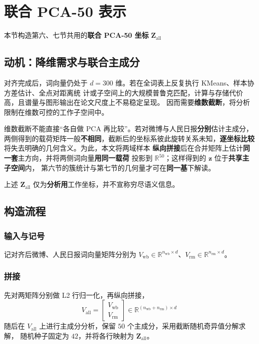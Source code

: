 \documentclass[withoutpreface]{cumcmthesis}
\begin{document}
\FloatBarrier

\section{联合 PCA-50 表示}

本节构造第六、七节共用的\textbf{联合 PCA-50 坐标} $\mathbf{Z}_{\mathrm{all}}$

\subsection{动机：降维需求与联合主成分}

对齐完成后，词向量仍处于 $d=300$ 维。若在全词表上反复执行 KMeans、样本协方差估计、全点对距离统
计或子空间上的大规模普鲁克匹配，计算与存储代价高，且谱量与图形输出在论文尺度上不易稳定呈现。
因而需要\textbf{维数截断}，将分析限制在维数可控的工作子空间中。

维数截断不能直接“各自做 PCA 再比较”。若对微博与人民日报\textbf{分别}估计主成分，
两侧得到的载荷矩阵一般\textbf{不相同}，截断后的坐标系彼此旋转关系未知，\textbf{逐坐标比较}
将失去明确的几何含义。为此，本文将两域样本
\textbf{纵向拼接}后在合并矩阵上估计\textbf{同一套}主方向，并将两侧词向量\textbf{用同一载荷}
投影到 $\mathbb{R}^{50}$；这样得到的 $\mathbf{z}$ 位于\textbf{共享主子空间}内，
第六节的簇统计与第七节的几何量才可在\textbf{同一基}下解读。

上述 $\mathbf{Z}_{\mathrm{all}}$ 仅为\textbf{分析用}工作坐标，并不宣称穷尽语义信息。

\subsection{构造流程}

\subsubsection{输入与记号}
记对齐后微博、人民日报词向量矩阵分别为 $V_{\mathrm{wb}}\in\mathbb{R}^{n_{\mathrm{wb}}\times d}$、$V_{\mathrm{rm}}\in\mathbb{R}^{n_{\mathrm{rm}}\times d}$。

\subsubsection{拼接}
先对两矩阵分别做 L2 行归一化，再纵向拼接，
\begin{equation}
  V_{\mathrm{all}} = \begin{bmatrix} V_{\mathrm{wb}} \\ V_{\mathrm{rm}} \end{bmatrix}\in\mathbb{R}^{(n_{\mathrm{wb}}+n_{\mathrm{rm}})\times d}
\end{equation}
随后在 $V_{\mathrm{all}}$ 上进行主成分分析，保留 $50$ 个主成分，采用截断随机奇异值分解求解，
随机种子固定为 $42$，并将各行映射为 $\mathbf{Z}_{\mathrm{all}}$。
\end{document}
